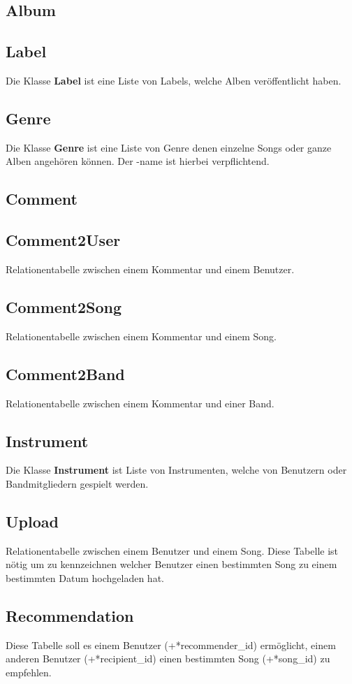 \documentclass[11pt,a4paper,DIV=9]{scrartcl}
\begin{document}
  \subsection{Album}
  \subsection{Label}
    Die Klasse \textbf{Label} ist eine Liste von Labels, welche Alben veröffentlicht haben.
  \subsection{Genre}
    Die Klasse \textbf{Genre} ist eine Liste von Genre denen einzelne Songs oder ganze Alben angehören können. Der -name ist hierbei verpflichtend.
  \subsection{Comment}
  \subsection{Comment2User}
    Relationentabelle zwischen einem Kommentar und einem Benutzer.
  \subsection{Comment2Song}
    Relationentabelle zwischen einem Kommentar und einem Song.
  \subsection{Comment2Band}
    Relationentabelle zwischen einem Kommentar und einer Band.
  \subsection{Instrument}
    Die Klasse \textbf{Instrument} ist Liste von Instrumenten, welche von Benutzern oder Bandmitgliedern gespielt werden.
  \subsection{Upload}
    Relationentabelle zwischen einem Benutzer und einem Song. Diese Tabelle ist n\"otig um zu kennzeichnen welcher Benutzer einen bestimmten Song zu einem bestimmten Datum hochgeladen hat.
  \subsection{Recommendation}
    Diese Tabelle soll es einem Benutzer (+*recommender\_id) ermöglicht, einem anderen Benutzer (+*recipient\_id) einen bestimmten Song (+*song\_id) zu empfehlen.
\end{document}
